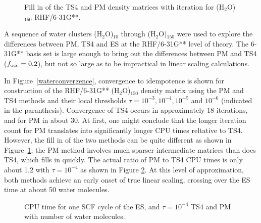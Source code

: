 \commentoutA{\documentclass[prb,aps,twocolumn,twocolumngrid,secnumarabic,superbib,hyperref]{revtex4}}
\begin{document}
{\begin{figure}[t]
\caption{Fill in of the TS4 and PM density matrices with iteration
for (H$_2$O)$_{150}$ RHF/6-31G**.} \label{fillin}
\end{figure}


A sequence of water clusters (H$_2$O)$_{10}$ through (H$_2$O)$_{150}$  \cite{WaterCluster}
were used to explore the differences between PM, TS4 and ES at the RHF/6-31G** level of theory.  
The 6-31G** basis set is large enough to bring out the differences between PM and TS4 
($f_{\rm occ}=0.2$), but not so large as to be impractical in linear scaling calculations.  

In Figure~\ref{waterconvergence}, convergence to idempotence is shown for 
construction of the  RHF/6-31G** (H$_2$O)$_{150}$ density matrix using the PM and TS4 methods
and their local thresholds $\tau=10^{-3}, 10^{-4}, 10^{-5}$ and $10^{-6}$ (indicated
in the paranthesis). Convergence
of TS4 occurs in approximately 18 iterations, and for PM in about 30.  At first, 
one might conclude that the longer iteration count for PM translates into significantly 
longer CPU times reltative to TS4. However, the fill in of the two methods
can be quite different as shown in Figure~\ref{fillin};  the PM method involves much
sparser intermediate matrices than does TS4, which fills in quickly.  The actual ratio
of PM to TS4 CPU times is only about 1.2 with $\tau=10^{-4}$ as shown in 
Figure \ref{cputimes}. At this level of approximation, both methods achieve 
an early onset of true linear scaling, crossing  over the ES time at about 50 water 
molecules. 

\begin{figure}[b]
\caption{CPU time for one SCF cycle of the ES, and 
	 $\tau=10^{-4}$ TS4 and PM with number of water molecules.}\label{cputimes}
\end{figure}

}
\end{document}
